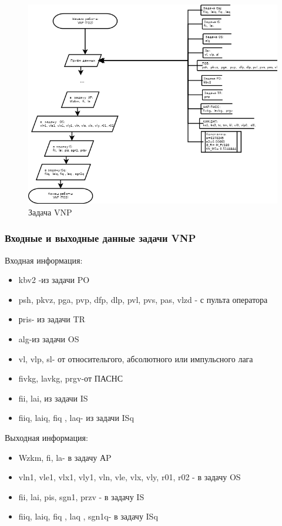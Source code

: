 \begin{figure}[H]
    \centering
    \includegraphics[width=0.75\linewidth]{images/VNP_simple.png}
    \caption{Задача VNP}
    \label{fig:VNP}
\end{figure}
\subsubsection{Входные и выходные данные задачи VNP}
Входная информация:
\begin{itemize}
\item kbv2 -из задачи  PO
\item psh,  pkvz,  pga,  pvp,  dfp, dlp, pvl, pvs, pas, vlzd - с пульта оператора
\item рris- из задачи  TR
\item alg-из задачи  OS
\item vl, vlp, sl- от относительгого, абсолютного или импульсного лага
\item fivkg,  lavkg,  prgv-от  ПАСНС
\item fii,  lai, из задачи IS
\item fiiq,  laiq, fiq , laq- из задачи ISq 
\end{itemize}
Выходная информация:
\begin{itemize}
\item Wzkm,  fi,  la- в  задачу  АP
\item vln1, vle1, vlx1, vly1, vln, vle, vlx, vly, r01, r02 - в  задачу   OS
\item fii,  lai, pis, sgn1, przv - в задачу IS
\item fiiq,  laiq, fiq , laq , sgn1q-  в задачу ISq  
\end{itemize}
